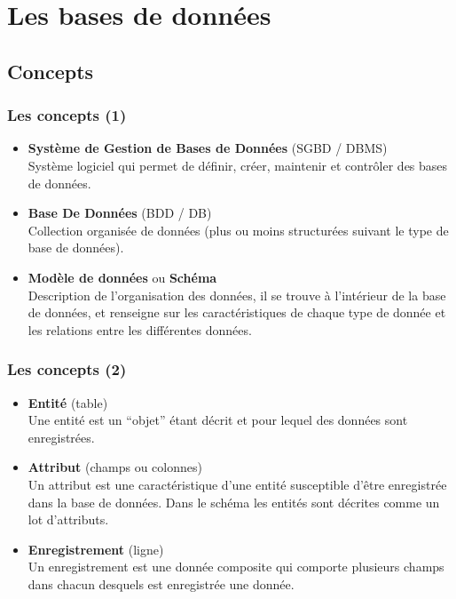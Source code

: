 \section{Les bases de données}
\label{sec:persistence}

\subsection{Concepts}
\label{subsec:persistence-concepts}

\begin{frame}
    \frametitle{Les concepts (1)}
    \begin{itemize}
        \item \textbf{Système de Gestion de Bases de Données} (SGBD / DBMS)\\
            Système logiciel qui permet de définir, créer, maintenir
            et contrôler des bases de données.
        \item \textbf{Base De Données} (BDD / DB)\\
            Collection organisée de données
            (plus ou moins structurées suivant le type de base de données).
        \item \textbf{Modèle de données} ou \textbf{Schéma}\\
            Description de l'organisation des données,
            il se trouve à l'intérieur de la base de données,
            et renseigne sur les caractéristiques de chaque type de donnée
            et les relations entre les différentes données.
    \end{itemize}
\end{frame}

\begin{frame}
    \frametitle{Les concepts (2)}
    \begin{itemize}
        \item \textbf{Entité} (table)\\
            Une entité est un \enquote{objet} étant décrit et pour lequel des données sont enregistrées.
        \item \textbf{Attribut} (champs ou colonnes)\\
            Un attribut est une caractéristique d'une entité susceptible
            d'être enregistrée dans la base de données.
            Dans le schéma les entités sont décrites comme un lot d'attributs.
        \item \textbf{Enregistrement} (ligne)\\
            Un enregistrement est une donnée composite qui comporte plusieurs
            champs dans chacun desquels est enregistrée une donnée.
    \end{itemize}
\end{frame}

